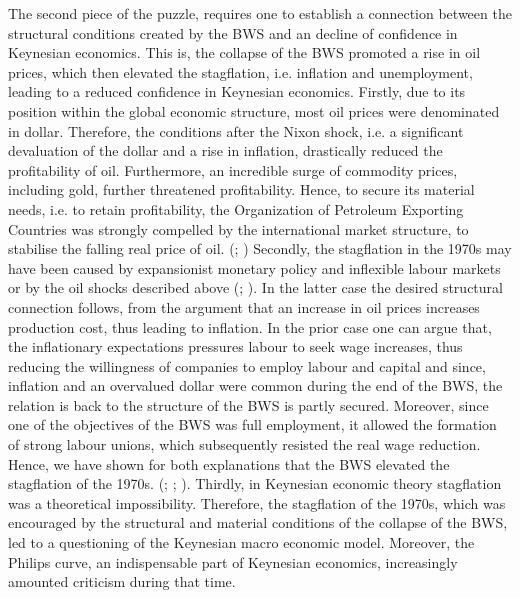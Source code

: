 \documentclass[11pt]{article}
\begin{document}
The second piece of the puzzle, requires one to establish a connection between the structural conditions created by the BWS and an decline of confidence in Keynesian economics. This is, the collapse of the BWS promoted a rise in oil prices, which then elevated the stagflation, i.e. inflation and unemployment, leading to a reduced confidence in Keynesian economics.
Firstly, due to its position within the global economic structure, most oil prices were denominated in dollar. Therefore, the conditions after the Nixon shock, i.e. a significant devaluation of the dollar and a rise in inflation, drastically reduced the profitability of oil. Furthermore, an incredible surge of commodity prices, including gold, further threatened profitability. Hence, to secure its material needs, i.e. to retain profitability, the Organization of Petroleum Exporting Countries was strongly compelled by the international market structure, to stabilise the falling real price of oil.
(\cite[p.~231]{BeaudMichel1983Ahoc}; \cite{hammes2005black})
Secondly, the stagflation in the 1970s may have been caused by expansionist monetary policy and inflexible labour markets or by the oil shocks described above (\cite{hunt2006oil, barsky2001we}; \cite[p.~192]{OlsonMancur1982Trad}). In the latter case the desired structural connection follows, from the argument that an increase in oil prices increases production cost, thus leading to inflation. In the prior case one can argue that, the inflationary expectations pressures labour to seek wage increases, thus reducing the willingness of companies to employ labour and capital and since, inflation and an overvalued dollar were common during the end of the BWS, the relation is back to the structure of the BWS is partly secured.
Moreover, since one of the objectives of the BWS was full employment, it allowed the formation of strong labour unions, which subsequently resisted the real wage reduction. Hence, we have shown for both explanations that the BWS elevated the stagflation of the 1970s. (\cite[p.~214]{JonesDanielStedman2014Motu}; \cite[p.~224]{BeaudMichel1983Ahoc}; \cite{KlimiukZbigniew2016TPaO}). 
Thirdly, in Keynesian economic theory stagflation was a theoretical impossibility. Therefore, the stagflation of the 1970s, which was encouraged by the structural and material conditions of the collapse of the BWS, led to a questioning of the Keynesian macro economic model. Moreover, the Philips curve, an indispensable part of Keynesian economics, increasingly amounted criticism during that time. 
\end{document}
